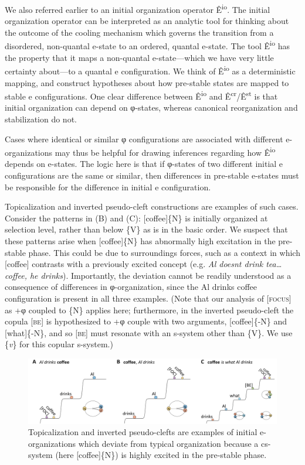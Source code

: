   We also referred earlier to an initial organization operator Ê\textsuperscript{io}. The initial organization operator can be interpreted as an analytic tool for thinking about the outcome of the cooling mechanism which governs the transition from a disordered, non-quantal e-state to an ordered, quantal e-state. The tool Ê\textsuperscript{io} has the property that it maps a non-quantal e-state—which we have very little certainty about—to a quantal e configuration. We think of Ê\textsuperscript{io} as a deterministic mapping, and construct hypotheses about how pre-stable states are mapped to stable e configurations. One clear difference between Ê\textsuperscript{io} and Ê\textsuperscript{cr}/Ê\textsuperscript{st} is that initial organization can depend on φ-states, whereas canonical reorganization and stabilization do not. 

  Cases where identical or similar φ configurations are associated with different e-organizations may thus be helpful for drawing inferences regarding how Ê\textsuperscript{io} depends on e-states. The logic here is that if φ-states of two different initial e configurations are the same or similar, then differences in pre-stable e-states must be responsible for the difference in initial e configuration. 

  Topicalization and inverted pseudo-cleft constructions are examples of such cases. Consider the patterns in (B) and (C): [coffee]\{N\} is initially organized at selection level, rather than below \{V\} as is in the basic order. We suspect that these patterns arise when [coffee]\{N\} has abnormally high excitation in the pre-stable phase. This could be due to surroundings forces, such as a context in which [coffee] contrasts with a previously excited concept (e.g. \textit{Al doesnt drink tea…coffee, he drinks}). Importantly, the deviation cannot be readily understood as a consequence of differences in φ-organization, since the {\textbar}Al drinks coffee{\textbar} configuration is present in all three examples. (Note that our analysis of [\textsc{focus}] as +φ coupled to \{N\} applies here; furthermore, in the inverted pseudo-cleft the copula [\textsc{be}] is hypothesized to +φ couple with two arguments, [coffee]\{-N\} and [what]\{-N\}, and so [\textsc{be}] must resonate with an s-system other than \{V\}. We use \{\textit{v}\} for this copular s-system.)

  
\begin{figure}
\includegraphics[width=\textwidth]{figures/Tilsen-img78.png}
\caption{Topicalization and inverted pseudo-clefts are examples of initial e-organizations which deviate from typical organization because a cs-system (here [coffee]\{N\}) is highly excited in the pre-stable phase.}
\label{fig:4:28}
\end{figure}
 

